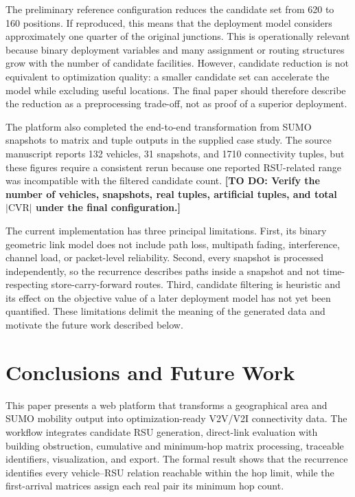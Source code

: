 \documentclass[engproc,proceedingpaper,submit,oneauthor]{Definitions/mdpi}
\newcommand{\todo}[1]{{\color{todored}\textbf{[TO DO: #1]}}}
\newcommand{\CVR}{\mathrm{CVR}}
\begin{document}
The preliminary reference configuration reduces the candidate set from 620 to 160 positions. If reproduced, this means that the deployment model considers approximately one quarter of the original junctions. This is operationally relevant because binary deployment variables and many assignment or routing structures grow with the number of candidate facilities. However, candidate reduction is not equivalent to optimization quality: a smaller candidate set can accelerate the model while excluding useful locations. The final paper should therefore describe the reduction as a preprocessing trade-off, not as proof of a superior deployment.

The platform also completed the end-to-end transformation from SUMO snapshots to matrix and tuple outputs in the supplied case study. The source manuscript reports 132 vehicles, 31 snapshots, and 1710 connectivity tuples, but these figures require a consistent rerun because one reported RSU-related range was incompatible with the filtered candidate count. \todo{Verify the number of vehicles, snapshots, real tuples, artificial tuples, and total $|\CVR|$ under the final configuration.}

The current implementation has three principal limitations. First, its binary geometric link model does not include path loss, multipath fading, interference, channel load, or packet-level reliability. Second, every snapshot is processed independently, so the recurrence describes paths inside a snapshot and not time-respecting store-carry-forward routes. Third, candidate filtering is heuristic and its effect on the objective value of a later deployment model has not yet been quantified. These limitations delimit the meaning of the generated data and motivate the future work described below.

\section{Conclusions and Future Work}
This paper presents a web platform that transforms a geographical area and SUMO mobility output into optimization-ready V2V/V2I connectivity data. The workflow integrates candidate RSU generation, direct-link evaluation with building obstruction, cumulative and minimum-hop matrix processing, traceable identifiers, visualization, and export. The formal result shows that the recurrence identifies every vehicle--RSU relation reachable within the hop limit, while the first-arrival matrices assign each real pair its minimum hop count.
\end{document}
